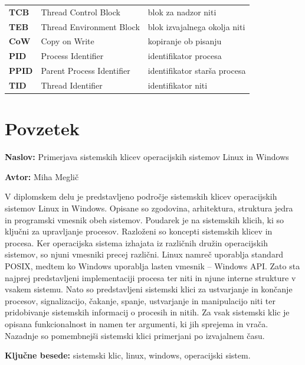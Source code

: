 \documentclass[a4paper,12pt,openright]{book}
\newcommand{\ttitle}{Primerjava sistemskih klicev operacijskih sistemov Linux in Windows}
\newcommand{\tauthor}{Miha Meglič}
\newcommand{\tkeywords}{sistemski klic, linux, windows, operacijski sistem}
\newcommand{\clearemptydoublepage}{\newpage{\pagestyle{empty}\cleardoublepage}}
\begin{document}
\begin{tabular}{p{}|p{}|p{}}
{\bf TCB}     & Thread Control Block                & blok za nadzor niti                        \\
{\bf TEB}     & Thread Environment Block            & blok izvajalnega okolja niti               \\
{\bf CoW}     & Copy on Write                       & kopiranje ob pisanju                       \\
{\bf PID}     & Process Identifier                  & identifikator procesa                      \\
{\bf PPID}    & Parent Process Identifier           & identifikator starša procesa               \\
{\bf TID}     & Thread Identifier                   & identifikator niti                         \\
\end{tabular}


\clearemptydoublepage

\chapter*{Povzetek}

\noindent\textbf{Naslov:} \ttitle
\bigskip

\noindent\textbf{Avtor:} \tauthor
\bigskip

\noindent V diplomskem delu je predstavljeno področje sistemskih klicev operacijskih sistemov Linux in Windows.
Opisane so zgodovina, arhitektura, struktura jedra in programski vmesnik obeh sistemov.
Poudarek je na sistemskih klicih, ki so ključni za upravljanje procesov.
Razloženi so koncepti sistemskih klicev in procesa.
Ker operacijska sistema izhajata iz različnih družin operacijskih sistemov, so njuni vmesniki precej različni.
Linux namreč uporablja standard POSIX, medtem ko Windows uporablja lasten vmesnik -- Windows API.
Zato sta najprej predstavljeni implementaciji procesa ter niti in njune interne strukture v vsakem sistemu.
Nato so predstavljeni sistemski klici za ustvarjanje in končanje procesov, signalizacijo, čakanje, spanje, ustvarjanje in manipulacijo niti ter pridobivanje sistemskih informacij o procesih in nitih.
Za vsak sistemski klic je opisana funkcionalnost in namen ter argumenti, ki jih sprejema in vrača.
Nazadnje so pomembnejši sistemski klici primerjani po izvajalnem času.

\bigskip

\noindent\textbf{Ključne besede:} \tkeywords.
\clearemptydoublepage
\end{document}
